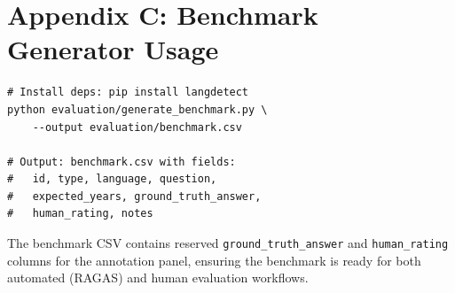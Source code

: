 \documentclass[12pt,a4paper]{article}
\begin{document}
\section{Appendix C: Benchmark Generator Usage}

\begin{lstlisting}[style=pythonstyle,caption={Generating the 330-question benchmark.}]
# Install deps: pip install langdetect
python evaluation/generate_benchmark.py \
    --output evaluation/benchmark.csv

# Output: benchmark.csv with fields:
#   id, type, language, question,
#   expected_years, ground_truth_answer,
#   human_rating, notes
\end{lstlisting}

The benchmark CSV contains reserved \texttt{ground\_truth\_answer} and
\texttt{human\_rating} columns for the annotation panel, ensuring the benchmark
is ready for both automated (RAGAS) and human evaluation workflows.
\end{document}
